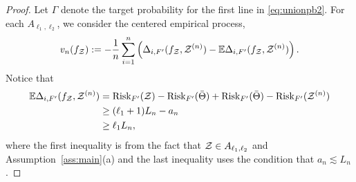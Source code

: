 \documentclass[11pt]{article}
\theoremstyle{plain}
\theoremstyle{definition}
\def\risk{\textup{Risk}}
\begin{document}
\begin{proof}
Let $\Gamma$ denote the target probability for the first line in \eqref{eq:unionpb2}.   For each $A_{\ell_1,\ell_2}$, we consider the centered empirical process,
\begin{align}\label{eq:vn2}
v_n(f_{\mathcal{Z}}) := -\frac{1}{n}\sum_{i=1}^n \left(\Delta_{i,F'}(f_{\mathcal{Z}},\mathcal{Z}^{(n)})- \mathbb{E}\Delta_{i,F'}(f_{\mathcal{Z}},\mathcal{Z}^{(n)})\right).
\end{align}
Notice  that 
\begin{align}
 \mathbb{E}\Delta_{i,F'}(f_\tZ,\tZ^{(n)}) &=  \risk_{F'}({\tZ})-\risk_{F'}(\bar\Theta)+\risk_{F'}({\bar\Theta})-\risk_{F'}(\tZ^{(n)})\\&\geq (\ell_1+1)L_n-a_n\\&\geq \ell_1 L_n,
\end{align}
where the first inequality is from the fact that $\mathcal{Z}\in A_{\ell_1,\ell_2}$ and Assumption~\ref{ass:main}(a) and the last inequality uses the condition that $a_n\lesssim L_n$.


\end{proof}
\end{document}
